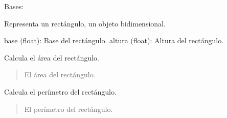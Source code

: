 \documentclass[letterpaper,10pt,spanish]{sphinxmanual}
\begin{document}
\begin{fulllineitems}
\label{\detokenize{pr8:pr8.3.Rectangulo}}
\pysigstartsignatures
{}
\pysigstopsignatures
\sphinxAtStartPar
Bases: {\hyperref[\detokenize{pr8:pr8.3.Objeto2D}]{}}

\sphinxAtStartPar
Representa un rectángulo, un objeto bidimensional.
\begin{description}
\sphinxAtStartPar
base (float): Base del rectángulo.
altura (float): Altura del rectángulo.

\end{description}

\begin{fulllineitems}
\label{\detokenize{pr8:pr8.3.Rectangulo.area}}
\pysigstartsignatures
{}
\pysigstopsignatures
\sphinxAtStartPar
Calcula el área del rectángulo.
\begin{quote}\begin{description}
\sphinxAtStartPar
El área del rectángulo.

\end{description}\end{quote}

\end{fulllineitems}


\begin{fulllineitems}
\label{\detokenize{pr8:pr8.3.Rectangulo.perimetro}}
\pysigstartsignatures
{}
\pysigstopsignatures
\sphinxAtStartPar
Calcula el perímetro del rectángulo.
\begin{quote}\begin{description}
\sphinxAtStartPar
El perímetro del rectángulo.

\end{description}\end{quote}

\end{fulllineitems}


\end{fulllineitems}
\end{document}
